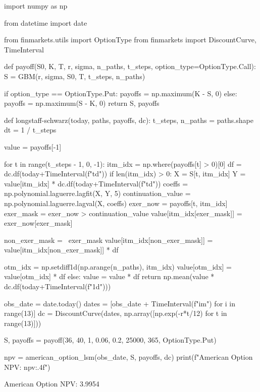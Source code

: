 \begin{ipythonnon}
import numpy as np
	
from datetime import date
	
from finmarkets.utils import OptionType 
from finmarkets import DiscountCurve, TimeInterval
	
def payoff(S0, K, T, r, sigma, n_paths, t_steps, option_type=OptionType.Call):    
  S = GBM(r, sigma, S0, T, t_steps, n_paths)    
	
  if option_type == OptionType.Put:
    payoffs = np.maximum(K - S, 0)
  else:
    payoffs = np.maximum(S - K, 0)
  return S, payoffs
	
def longstaff-schwarz(today, paths, payoffs, dc):    
  t_steps, n_paths = paths.shape
  dt = 1 / t_steps
	
  value = payoffs[-1]
	
  for t in range(t_steps - 1, 0, -1):
    itm_idx = np.where(payoffs[t] > 0)[0]
    df = dc.df(today+TimeInterval(f"{t}d"))
    if len(itm_idx) > 0:
      X = S[t, itm_idx]
      Y = value[itm_idx] * dc.df(today+TimeInterval(f"{t}d"))
      coeffs = np.polynomial.laguerre.lagfit(X, Y, 5)
      continuation_value = np.polynomial.laguerre.lagval(X, coeffs)	
      exer_now = payoffs[t, itm_idx]	
      exer_mask = exer_now > continuation_value
      value[itm_idx[exer_mask]] = exer_now[exer_mask]
	
      non_exer_mask = ~exer_mask
      value[itm_idx[non_exer_mask]] = value[itm_idx[non_exer_mask]] * df
	
      otm_idx = np.setdiff1d(np.arange(n_paths), itm_idx)
      value[otm_idx] = value[otm_idx] * df
    else:
      value = value * df
    return np.mean(value * dc.df(today+TimeInterval(f"{1}d")))
	
obs_date = date.today()
dates = [obs_date + TimeInterval(f"{i}m") for i in range(13)]
dc = DiscountCurve(dates, np.array([np.exp(-r*t/12) for t in range(13)]))
	
S, payoffs = payoff(36, 40, 1, 0.06, 0.2, 25000, 365, OptionType.Put)
	
npv = american_option_lsm(obs_date, S, payoffs, dc)
print(f"American Option NPV: {npv:.4f}")	
\end{ipythonnon}
\begin{ioutput}
	American Option NPV: 3.9954
\end{ioutput}


%
%


